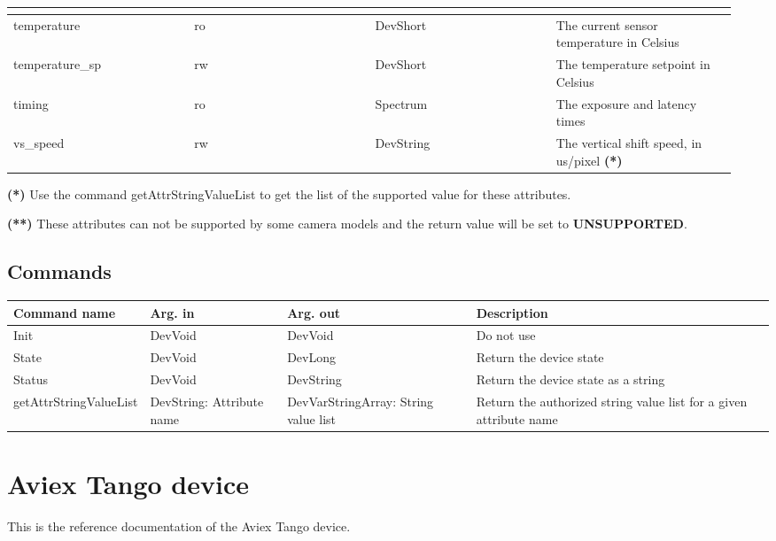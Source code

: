 \documentclass[letterpaper,10pt,english]{sphinxmanual}
\begin{document}
\begin{tabular}{|p{0.237\linewidth}|p{0.237\linewidth}|p{0.237\linewidth}|p{0.237\linewidth}|}
\begin{description}
\begin{itemize}
\end{itemize}

\end{description}
\\
\hline
temperature
 & 
ro
 & 
DevShort
 & 
The current sensor temperature in Celsius
\\
\hline
temperature\_sp
 & 
rw
 & 
DevShort
 & 
The temperature setpoint in Celsius
\\
\hline
timing
 & 
ro
 & 
Spectrum
 & 
The exposure and latency times
\\
\hline
vs\_speed
 & 
rw
 & 
DevString
 & 
The vertical shift speed, in us/pixel \textbf{(*)}
\\
\hline\end{tabular}


\textbf{(*)} Use the command getAttrStringValueList to get the list of the supported value for these attributes.

\textbf{(**)} These attributes can not be supported by some camera models and the return value will be set to  \textbf{UNSUPPORTED}.


\section{Commands}
\label{AndorCCD/andorccd:commands}
\begin{tabulary}{\linewidth}{|L|L|L|L|}
\hline
\textsf{\relax 
Command name
} & \textsf{\relax 
Arg. in
} & \textsf{\relax 
Arg. out
} & \textsf{\relax 
Description
}\\
\hline
Init
 & 
DevVoid
 & 
DevVoid
 & 
Do not use
\\
\hline
State
 & 
DevVoid
 & 
DevLong
 & 
Return the device state
\\
\hline
Status
 & 
DevVoid
 & 
DevString
 & 
Return the device state as a string
\\
\hline
getAttrStringValueList
 & 
DevString:
Attribute name
 & 
DevVarStringArray:
String value list
 & 
Return the authorized string value list for
a given attribute name
\\
\hline\end{tabulary}



\chapter{Aviex Tango device}
\label{AviexCCD/aviexccd:aviex-tango-device}\label{AviexCCD/aviexccd::doc}
This is the reference documentation of the Aviex Tango device.
\end{document}
